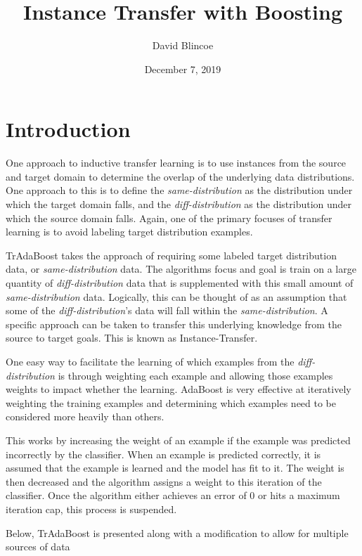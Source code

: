 \documentclass[12pt]{article}
\title{Instance Transfer with Boosting}
\author{David Blincoe}
\date{December 7, 2019}
\begin{document}
    \maketitle
    \section{Introduction} \label{boost-intro}
      One approach to inductive transfer learning is to use instances from the source and target
      domain to determine the overlap of the underlying data distributions. One approach to this
      is to define the {\it same-distribution} as the distribution under which the target domain falls,
      and the {\it diff-distribution} as the distribution under which the source domain falls. Again,
      one of the primary focuses of transfer learning is to avoid labeling target distribution examples.

      TrAdaBoost takes the approach of requiring some labeled target distribution data, or {\it same-distribution}
      data. The algorithms focus and goal is train on a large quantity of {\it diff-distribution} data that is
      supplemented with this small amount of {\it same-distribution} data. Logically, this can be thought of as
      an assumption that some of the {\it diff-distribution}’s data will fall within the {\it same-distribution}. A
      specific approach can be taken to transfer this underlying knowledge from the source to target goals.
      This is known as Instance-Transfer.

      One easy way to facilitate the learning of which examples from the {\it diff-distribution} is through
      weighting each example and allowing those examples weights to impact whether the learning. AdaBoost
      is very effective at iteratively weighting the training examples and determining which examples need
      to be considered more heavily than others.

      This works by increasing the weight of an example if the example was predicted incorrectly by the
      classifier. When an example is predicted correctly, it is assumed that the example is learned and
      the model has fit to it. The weight is then decreased and the algorithm assigns a weight to this
      iteration of the classifier. Once the algorithm either achieves an error of 0 or hits a maximum
      iteration cap, this process is suspended.

      Below, TrAdaBoost is presented along with a modification to allow for multiple sources of data
\end{document}
